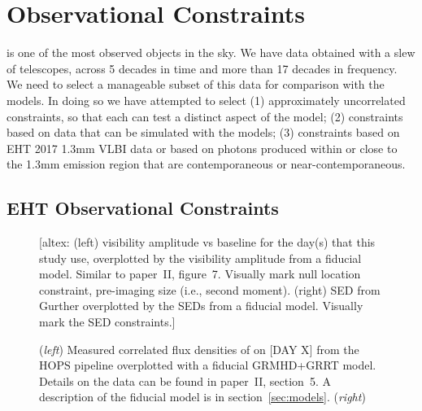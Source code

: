\section{Observational Constraints}\label{sec:observations}

\sgra is one of the most observed objects in the sky.
We have data obtained with a slew of telescopes, across 5 decades in time and more than 17 decades in frequency. We need to select a manageable subset of this data for comparison with the models. In doing so we have attempted to select (1) approximately uncorrelated constraints, so that each can test a distinct aspect of the model; (2) constraints based on data that can be simulated with the models; (3) constraints based on EHT 2017 1.3mm VLBI data or based on photons produced within or close to the 1.3mm emission region that are contemporaneous or near-contemporaneous.


\subsection{EHT Observational Constraints}


\begin{figure*}
  \centering
  [altex: (left) visibility amplitude vs baseline for the day(s) that
    this study use, overplotted by the visibility amplitude from a
    fiducial model.
    Similar to paper~II, figure~7.
    Visually mark null location constraint, pre-imaging size (i.e.,
    second moment).
    (right) SED from Gurther overplotted by the SEDs from a fiducial
    model.
    Visually mark the SED constraints.]
  \caption{(\emph{left}) Measured correlated flux densities of \sgra
    on [DAY X] from the HOPS pipeline overplotted with a fiducial
    GRMHD+GRRT model.
    Details on the data can be found in paper~II, section~5.
    A description of the fiducial model is in
    section~\ref{sec:models}.
    (\emph{right}) }
  \label{fig:visibility}
\end{figure*}

